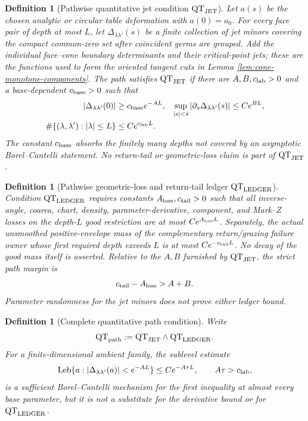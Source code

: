 \documentclass[11pt]{article}
\newtheorem{definition}[theorem]{Definition}
\begin{document}
\begin{definition}[Pathwise quantitative jet condition
$\mathrm{QT}_{\rm JET}$]
\label{def:quantitative-circular-jets}
Let $a(s)$ be the chosen analytic or circular table deformation with
$a(0)=a_0$.  For every face pair of depth at most $L$, let
$\Delta_{\lambda\lambda'}(s)$ be a finite collection of jet minors covering
the compact common-zero set after coincident germs are grouped.  Add the
individual face--cone boundary determinants and their critical-point jets;
these are the functions used to form the oriented tangent cuts in Lemma
\ref{lem:cone-monotone-components}.  The path satisfies
$\mathrm{QT}_{\rm JET}$ if there are $A,B,c_{\rm lab}>0$ and a
base-dependent $c_{\rm base}>0$ such that
\begin{align}
 |\Delta_{\lambda\lambda'}(0)|&\ge c_{\rm base}e^{-AL},
 &\sup_{|s|<\bar s}|\partial_s\Delta_{\lambda\lambda'}(s)|&\le Ce^{BL},
 \label{eq:pathwise-minor-bounds}\\
 \#\{(\lambda,\lambda'):|\lambda|\le L\}&\le Ce^{c_{\rm lab}L}.
 \label{eq:pathwise-label-count}
\end{align}
The constant $c_{\rm base}$ absorbs the finitely many depths not covered by
an asymptotic Borel--Cantelli statement.  No return-tail or geometric-loss
claim is part of $\mathrm{QT}_{\rm JET}$.
\end{definition}

\begin{definition}[Pathwise geometric-loss and return-tail ledger
$\mathrm{QT}_{\rm LEDGER}$]
\label{def:quantitative-path-ledger}
Condition $\mathrm{QT}_{\rm LEDGER}$ requires constants
$A_{\rm loss},c_{\rm tail}>0$ such that all inverse-angle, coarea, chart,
density, parameter-derivative, component, and Mark--$Z$ losses on the
depth-$L$ good restriction are at most $Ce^{A_{\rm loss}L}$.  Separately,
the actual unsmoothed positive-envelope mass of the complementary
return/grazing failure owner whose first required depth exceeds $L$ is at
most $Ce^{-c_{\rm tail}L}$.  No decay of the good mass itself is asserted.
Relative to the $A,B$ furnished by
$\mathrm{QT}_{\rm JET}$, the strict path margin is
\begin{equation}
\label{eq:strict-jet-tail-margin}
 c_{\rm tail}-A_{\rm loss}>A+B.
\end{equation}
Parameter randomness for the jet minors does not prove either ledger bound.
\end{definition}

\begin{definition}[Complete quantitative path condition]
\label{def:complete-QT-path}
Write
\[
 \mathrm{QT}_{\rm path}:=\mathrm{QT}_{\rm JET}
 \wedge\mathrm{QT}_{\rm LEDGER}.
\]
For a finite-dimensional ambient family, the sublevel estimate
\[
 \operatorname{Leb}\{a:|\Delta_{\lambda\lambda'}(a)|<e^{-AL}\}
 \le Ce^{-A\tau L},\qquad A\tau>c_{\rm lab},
\]
is a sufficient Borel--Cantelli mechanism for the first inequality at almost
every base parameter, but it is not a substitute for the derivative bound or
for $\mathrm{QT}_{\rm LEDGER}$.
\end{definition}
\end{document}
